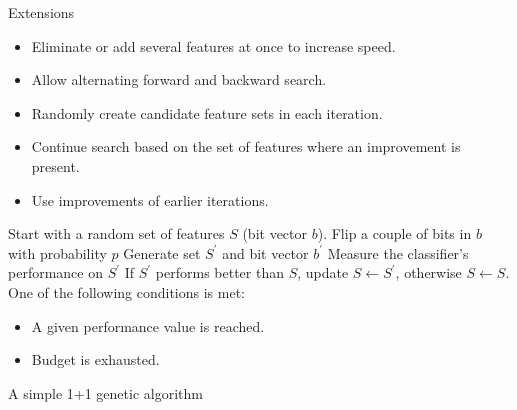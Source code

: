 \documentclass[11pt,compress,t,notes=noshow, xcolor=table]{beamer}
\begin{document}
  \begin{vbframe}{Extensions}

    \begin{itemize}
      \setlength{\itemsep}{1.0em}
      \item Eliminate or add several features at once to increase speed.
      \item Allow alternating forward and backward search.
      \item Randomly create candidate feature sets in each iteration.
      \item Continue search based on the set of features where an improvement is present.
      \item Use improvements of earlier iterations.
    \end{itemize}

    \framebreak

    \begin{algorithm}[H]
    \begin{algorithmic}[1]
      \State Start with a random set of features $S$ (bit vector $b$).
      \Repeat
      \State Flip a couple of bits in $b$ with probability $p$
      \State Generate set $S^\prime$ and bit vector $b^\prime$
      \State Measure the classifier's performance on $S^\prime$
      \State If $S^\prime$ performs better than $S$, update $S \leftarrow S^\prime$, otherwise $S \leftarrow S$.
      \Until One of the following conditions is met:
        \begin{itemize}
          \item A given performance value is reached.
          \item Budget is exhausted.
        \end{itemize}
        \caption{A simple 1+1 genetic algorithm}
    \end{algorithmic}
    \end{algorithm}

 \end{vbframe}   
\end{document}
